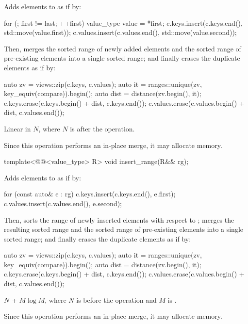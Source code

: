 \begin{itemdescr}
\pnum
\effects
Adds elements to  as if by:
\begin{codeblock}
for (; first != last; ++first) {
  value_type value = *first;
  c.keys.insert(c.keys.end(), std::move(value.first));
  c.values.insert(c.values.end(), std::move(value.second));
}
\end{codeblock}
Then, merges the sorted range of newly added elements and
the sorted range of pre-existing elements into a single sorted range; and
finally erases the duplicate elements as if by:
\begin{codeblock}
auto zv = views::zip(c.keys, c.values);
auto it = ranges::unique(zv, key_equiv(compare)).begin();
auto dist = distance(zv.begin(), it);
c.keys.erase(c.keys.begin() + dist, c.keys.end());
c.values.erase(c.values.begin() + dist, c.values.end());
\end{codeblock}

\pnum
\complexity
Linear in $N$, where $N$ is  after the operation.

\pnum
\remarks
Since this operation performs an in-place merge, it may allocate memory.
\end{itemdescr}

%
\begin{itemdecl}
template<@@<value_type> R>
  void insert_range(R&& rg);
\end{itemdecl}

\begin{itemdescr}
\pnum
\effects
Adds elements to  as if by:
\begin{codeblock}
for (const auto& e : rg) {
  c.keys.insert(c.keys.end(), e.first);
  c.values.insert(c.values.end(), e.second);
}
\end{codeblock}
Then, sorts the range of newly inserted elements
with respect to ;
merges the resulting sorted range and
the sorted range of pre-existing elements into a single sorted range; and
finally erases the duplicate elements as if by:
\begin{codeblock}
auto zv = views::zip(c.keys, c.values);
auto it = ranges::unique(zv, key_equiv(compare)).begin();
auto dist = distance(zv.begin(), it);
c.keys.erase(c.keys.begin() + dist, c.keys.end());
c.values.erase(c.values.begin() + dist, c.values.end());
\end{codeblock}

\pnum
\complexity
$N$ + $M \log M$,
where $N$ is  before the operation and
$M$ is .

\pnum
\remarks
Since this operation performs an in-place merge, it may allocate memory.
\end{itemdescr}

